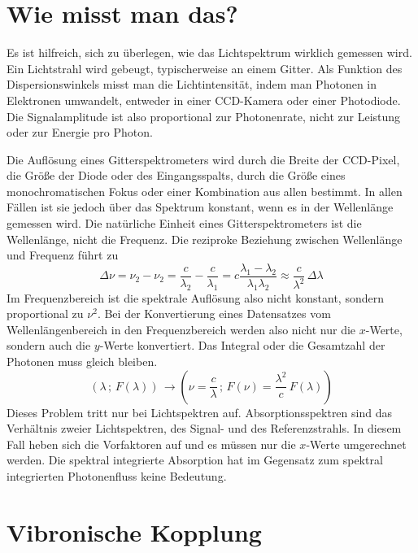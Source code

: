 \section{Wie misst man das?}


Es ist hilfreich, sich zu überlegen, wie das Lichtspektrum wirklich gemessen wird. Ein Lichtstrahl wird gebeugt, typischerweise an einem Gitter. Als Funktion des Dispersionswinkels misst man die Lichtintensität, indem man Photonen in Elektronen umwandelt, entweder in einer CCD-Kamera oder einer Photodiode. Die Signalamplitude ist also proportional zur Photonenrate, nicht zur Leistung oder zur Energie pro Photon.

Die Auflösung eines Gitterspektrometers wird durch die Breite der CCD-Pixel, die Größe der Diode oder des Eingangsspalts, durch die Größe eines monochromatischen Fokus oder einer Kombination aus allen bestimmt. In allen Fällen ist sie jedoch über das Spektrum konstant, wenn es in der Wellenlänge gemessen wird. Die natürliche Einheit eines Gitterspektrometers ist die Wellenlänge, nicht die Frequenz. Die reziproke Beziehung zwischen Wellenlänge und Frequenz führt zu 
\begin{equation}
 \Delta \nu = \nu_2 - \nu_2 = \frac{c}{\lambda_2} - \frac{c}{\lambda_1}  = c \frac{\lambda_1 - \lambda_2}{\lambda_1 \lambda_2} \approx \frac{c}{\lambda^2} \, \Delta \lambda
\end{equation}
Im Frequenzbereich ist die spektrale Auflösung also nicht konstant, sondern proportional zu $\nu^2$. Bei der Konvertierung eines Datensatzes vom Wellenlängenbereich in den Frequenzbereich werden also nicht nur die $x$-Werte, sondern auch die $y$-Werte konvertiert. Das Integral oder die Gesamtzahl der Photonen muss gleich bleiben.
\begin{equation}
 \left( \lambda \, ; \, F(\lambda) \right) \, \rightarrow  \left( \nu = \frac{c}{ \lambda} \, ; \,  F(\nu) = \frac{\lambda^2}{ c } \, F(\lambda) \right) 
\end{equation}
Dieses Problem tritt nur bei Lichtspektren auf. Absorptionsspektren sind das Verhältnis zweier Lichtspektren, des Signal- und des Referenzstrahls. In diesem Fall heben sich die Vorfaktoren auf und es müssen nur die $x$-Werte umgerechnet werden. Die spektral integrierte Absorption hat im Gegensatz zum spektral integrierten Photonenfluss keine Bedeutung.



\section{Vibronische Kopplung}

